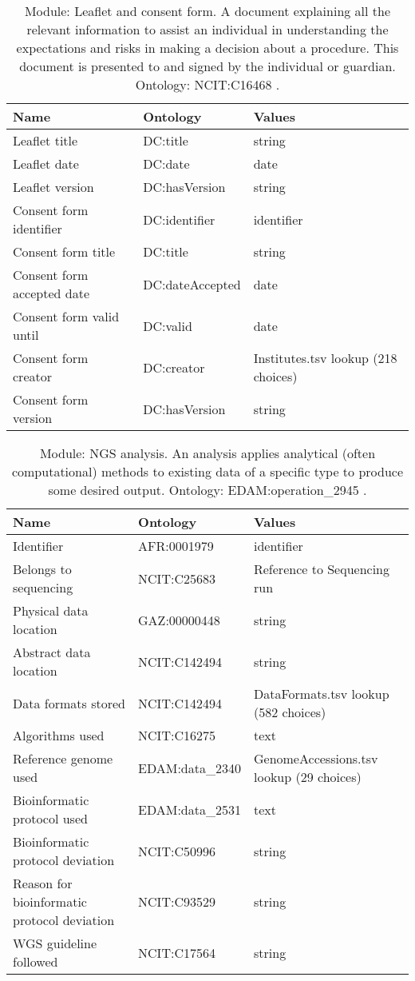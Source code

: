 \documentclass{article}
\begin{document}
\begin{table}[htb]
\begin{tabular}{lll}
Name & Ontology & Values \\
\hline
Leaflet title & DC:title  & string \\
Leaflet date & DC:date  & date \\
Leaflet version & DC:hasVersion  & string \\
Consent form identifier & DC:identifier  & identifier \\
Consent form title & DC:title  & string \\
Consent form accepted date & DC:dateAccepted  & date \\
Consent form valid until & DC:valid  & date \\
Consent form creator & DC:creator  & Institutes.tsv lookup (218 choices) \\
Consent form version & DC:hasVersion  & string \\
\hline
\end{tabular}
\caption[Module: Leaflet and consent form]{\label{table:table14} Module: Leaflet and consent form. A document explaining all the relevant information to assist an individual in understanding the expectations and risks in making a decision about a procedure. This document is presented to and signed by the individual or guardian. Ontology: NCIT:C16468 . }
\end{table}

\begin{table}[htb]
\begin{tabular}{lll}
Name & Ontology & Values \\
\hline
Identifier & AFR:0001979  & identifier \\
Belongs to sequencing & NCIT:C25683  & Reference to Sequencing run \\
Physical data location & GAZ:00000448  & string \\
Abstract data location & NCIT:C142494  & string \\
Data formats stored & NCIT:C142494  & DataFormats.tsv lookup (582 choices) \\
Algorithms used & NCIT:C16275  & text \\
Reference genome used & EDAM:data\_2340  & GenomeAccessions.tsv lookup (29 choices) \\
Bioinformatic protocol used & EDAM:data\_2531  & text \\
Bioinformatic protocol deviation & NCIT:C50996  & string \\
Reason for bioinformatic protocol deviation & NCIT:C93529  & string \\
WGS guideline followed & NCIT:C17564  & string \\
\hline
\end{tabular}
\caption[Module: NGS analysis]{\label{table:table15} Module: NGS analysis. An analysis applies analytical (often computational) methods to existing data of a specific type to produce some desired output. Ontology: EDAM:operation\_2945 . }
\end{table}
\end{document}
